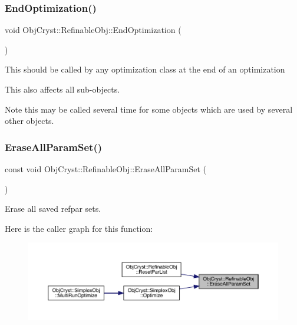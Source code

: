 \subsubsection{\texorpdfstring{EndOptimization()}{EndOptimization()}}
{\footnotesize\ttfamily void Obj\+Cryst\+::\+Refinable\+Obj\+::\+End\+Optimization (\begin{DoxyParamCaption}{ }\end{DoxyParamCaption})\hspace{0.3cm}{\ttfamily [virtual]}}

This should be called by any optimization class at the end of an optimization

This also affects all sub-\/objects. \begin{DoxyNote}{Note}
this may be called several time for some objects which are used by several other objects. 
\end{DoxyNote}
\mbox{\label{class_obj_cryst_1_1_refinable_obj_ac269ad4ad4ca8b4e9f13f5466475d959}} 
\subsubsection{\texorpdfstring{EraseAllParamSet()}{EraseAllParamSet()}}
{\footnotesize\ttfamily const void Obj\+Cryst\+::\+Refinable\+Obj\+::\+Erase\+All\+Param\+Set (\begin{DoxyParamCaption}{ }\end{DoxyParamCaption})}



Erase all saved refpar sets. 

Here is the caller graph for this function\+:
\nopagebreak
\begin{figure}[H]
\begin{center}
\leavevmode
\includegraphics[width=350pt]{class_obj_cryst_1_1_refinable_obj_ac269ad4ad4ca8b4e9f13f5466475d959_icgraph}
\end{center}
\end{figure}
\mbox{\label{class_obj_cryst_1_1_refinable_obj_a0803a4bd89142dc93c79ed3329bb6e1d}} 
